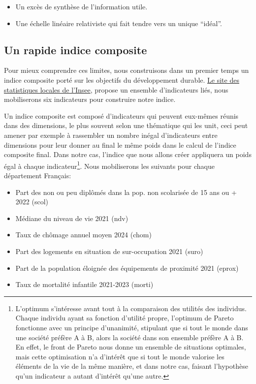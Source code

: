 \documentclass[
  french,
  11pt,
  a4paper,
]{article}
\begin{document}
\begin{itemize}
\item
  Un excès de synthèse de l'information utile.
\item
  Une échelle linéaire relativiste qui fait tendre vers un unique
  ``idéal''.
\end{itemize}

\subsection{Un rapide indice
composite}\label{un-rapide-indice-composite}

Pour mieux comprendre ces limites, nous construisons dans un premier
temps un indice composite porté sur les objectifs du développement
durable. \href{https://statistiques-locales.insee.fr/}{Le site des
statistiques locales de l'Insee}, propose un ensemble d'indicateurs
liés, nous mobiliserons six indicateurs pour construire notre indice.

Un indice composite est composé d'indicateurs qui peuvent eux-mêmes
réunis dans des dimensions, le plus souvent selon une thématique qui les
unit, ceci peut amener par exemple à rassembler un nombre inégal
d'indicateurs entre dimensions pour leur donner au final le même poids
dans le calcul de l'indice composite final. Dans notre cas, l'indice que
nous allons créer appliquera un poids égal à chaque
indicateur\footnote{L'optimum s'intéresse avant tout à la comparaison
  des utilités des individus. Chaque individu ayant sa fonction
  d'utilité propre, l'optimum de Pareto fonctionne avec un principe
  d'unanimité, stipulant que si tout le monde dans une société préfère A
  à B, alors la société dans son ensemble préfère A à B. En effet, le
  front de Pareto nous donne un ensemble de situations optimales, mais
  cette optimisation n'a d'intérêt que si tout le monde valorise les
  éléments de la vie de la même manière, et dans notre cas, faisant
  l'hypothèse qu'un indicateur a autant d'intérêt qu'une autre.}. Nous
mobiliserons les suivants pour chaque département Français:

\begin{itemize}
\item
  Part des non ou peu diplômés dans la pop. non scolarisée de 15 ans ou
  + 2022 (scol)
\item
  Médiane du niveau de vie 2021 (ndv)
\item
  Taux de chômage annuel moyen 2024 (chom)
\item
  Part des logements en situation de sur-occupation 2021 (suro)
\item
  Part de la population éloignée des équipements de proximité 2021
  (eprox)
\item
  Taux de mortalité infantile 2021-2023 (morti)
\end{itemize}
\end{document}
